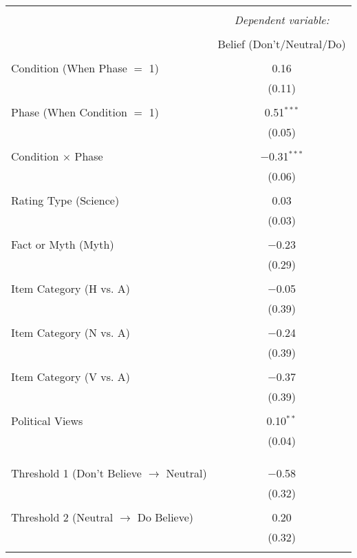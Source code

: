 \documentclass[12pt]{article}  %
\begin{document}
\begin{table}[!htbp] \centering 
\begin{tabular}{@{\extracolsep{5pt}}lc} 
\\[-1.8ex]\hline 
\hline \\[-1.8ex] 
 & \multicolumn{1}{c}{\textit{Dependent variable:}} \\ 
\cline{2-2} 
\\[-1.8ex] & Belief (Don't/Neutral/Do) \\ 
\hline \\[-1.8ex] 
 Condition (When Phase $=$ 1) & 0.16 \\ 
  & (0.11) \\ 
  & \\ 
 Phase (When Condition $=$ 1) & 0.51$^{***}$ \\ 
  & (0.05) \\ 
  & \\ 
 Condition $\times$ Phase & $-$0.31$^{***}$ \\ 
  & (0.06) \\ 
  & \\ 
 Rating Type (Science) & 0.03 \\ 
  & (0.03) \\ 
  & \\ 
 Fact or Myth (Myth) & $-$0.23 \\ 
  & (0.29) \\ 
  & \\ 
 Item Category (H vs. A) & $-$0.05 \\ 
  & (0.39) \\ 
  & \\ 
 Item Category (N vs. A) & $-$0.24 \\ 
  & (0.39) \\ 
  & \\ 
 Item Category (V vs. A) & $-$0.37 \\ 
  & (0.39) \\ 
  & \\ 
 Political Views & 0.10$^{**}$ \\ 
  & (0.04) \\ 
  & \\ 
 \hline \\[-1.8ex] 
  & \\
 Threshold 1 (Don't Believe $\rightarrow$ Neutral) & $-$0.58 \\ 
  & (0.32) \\ 
  & \\ 
 Threshold 2 (Neutral $\rightarrow$ Do Believe) & 0.20 \\ 
  & (0.32) \\ 

\hline 
\hline \\[-1.8ex]
\end{tabular} 
\end{table} 
\end{document}
